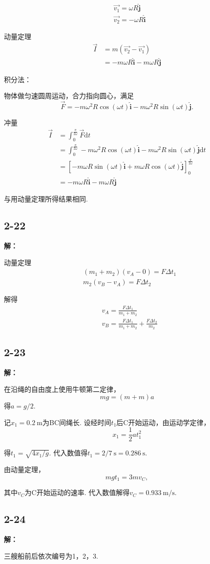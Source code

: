 \documentclass[twocolumn]{ctexart}
\newcommand{\sol}[1]{\subsection*{#1}\noindent\textbf{解：}

}
\begin{document}
	\begin{align*}
		&\vec{v_1}=\omega R\hat{\mathbf{j}}\\
		&\vec{v_2}=-\omega R\hat{\mathbf{i}}
	\end{align*}

	动量定理
	\begin{align*}
		\vec{I}&=m\left(\vec{v_2}-\vec{v_1}\right)\\
		&=-m\omega R\hat{\mathbf{i}}-m\omega R\hat{\mathbf{j}}
	\end{align*}

	\noindent
	积分法：
	
	物体做匀速圆周运动，合力指向圆心，满足
	$$\vec{F}=-m\omega^2R\cos(\omega t)\hat{\mathbf{i}}-m\omega^2R\sin(\omega t)\hat{\mathbf{j}}.$$
	
	冲量
	\begin{align*}
		\vec{I}&=\int_{0}^{\frac{\pi}{2\omega}}\vec{F}\mathrm{d}t\\
		&=\int_{0}^{\frac{\pi}{2\omega}}-m\omega^2R\cos(\omega t)\hat{\mathbf{i}}-m\omega^2R\sin(\omega t)\hat{\mathbf{j}}\mathrm{d}t\\
		&=\left[-m\omega R\sin(\omega t)\hat{\mathbf{i}}+m\omega R\cos(\omega t)\hat{\mathbf{j}}\right]_0^{\frac{\pi}{2\omega}}\\
		&=-m\omega R\hat{\mathbf{i}}-m\omega R\hat{\mathbf{j}}
	\end{align*}

	与用动量定理所得结果相同.
	\sol{2-22}
	动量定理
	\begin{align*}
		&\left(m_1+m_2\right)\left(v_A-0\right)=F\Delta t_1\\
		&m_2\left(v_B-v_A\right)=F\Delta t_2
	\end{align*}
	
	解得
	\begin{align*}
		&v_A=\frac{F\Delta t_1}{m_1+m_2}\\
		&v_B=\frac{F\Delta t_1}{m_1+m_2}+\frac{F\Delta t_2}{m_2}
	\end{align*}
	\sol{2-23}
	在沿绳的自由度上使用牛顿第二定律，
	$$mg=(m+m)a$$
	得$a=g/2$.
	
	记$x_1=0.2\ \mathrm{m}$为BC间绳长. 设经时间$t_1$后C开始运动，由运动学定律，
	$$x_1=\frac{1}{2}at_1^2$$
	
	得$t_1=\sqrt{4x_1/g}$. 代入数值得$t_1=2/7\ \mathrm{s}=0.286\ \mathrm{s}$.
	
	由动量定理，
	$$mgt_1=3mv_C,$$
	
	其中$v_C$为C开始运动的速率. 代入数值解得$v_C=0.933\ \mathrm{m/s}$.
	\sol{2-24}
	三艘船前后依次编号为1，2，3.
	
\end{document}
